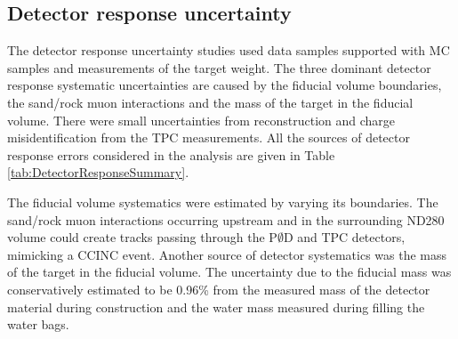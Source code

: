 \subsection{Detector response uncertainty}
The detector response uncertainty studies 
used data samples supported with MC samples
and measurements of the target weight.
The three dominant detector response 
systematic uncertainties %
are caused by the fiducial volume boundaries, 
the sand/rock muon interactions 
and the mass of the target in the fiducial volume.
There were small uncertainties from reconstruction and
charge misidentification from the TPC measurements. 
All the sources of detector response errors considered 
in the analysis are given 
in Table \ref{tab:DetectorResponseSummary}.

The fiducial volume systematics were
estimated by varying its  boundaries.
The sand/rock muon interactions occurring upstream and 
in the surrounding ND280 volume
could create tracks passing through the P$\emptyset$D and TPC detectors,
mimicking a CCINC event. 
Another source of detector systematics was the mass of the target 
in the fiducial volume. The uncertainty due to the fiducial mass 
was conservatively estimated to be 0.96\%
from the measured mass of the detector material during construction and
the water mass measured during filling the water bags.



















